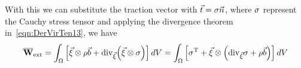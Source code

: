 \documentclass[../../main-notes.tex]{subfiles}
\begin{document}
With this we can substitute the traction vector with $\vec{t}=\bold{\sigma}\vec{n}$, where $\bold{\sigma}$ represent the Cauchy stress tensor and applying the divergence theorem in~\eqref{eqn:DerVirTen13}, we have 
\begin{equation}
    \overline{\bold{W}}_{\mathrm{ext}}
     =\int_{\Omega}
        \left[
            \vec{\xi}\otimes\rho\vec{b}+\mathrm{div}_{\vec{\xi}}\qty(\vec{\xi}\otimes\bold{\sigma})
        \right]dV
        =
    \int_{\Omega}
        \left[
            \bold{\sigma}^{\mathrm{T}}
            +
            \vec{\xi}\otimes\qty(\mathrm{div}_{\vec{\xi}}\bold{\sigma}+\rho\vec{b})
        \right]dV
\end{equation}


\begin{comment}
Stress is an important concept in characterizong the states of condensed matter.
A body is in a state of stress if it is acted upon by external force or, more generally, if one part of the body exerts forces upon another part.
If we consider a volume element within a stressed body, we can distinguish the effect of two types of forces: those acting directly in the interior of the element and those exerted upon the surface of the element by the surrounding material.
The latter forces (per unit area) are stress that are transmitted throught the interior of the volume.
For condensed matter in which the stress is homogeneous in volumes of macroscopic dimensions, the equation of state in the relation between the stress and the internal variables, such as the density and temperature.\footnote{Cite Quantum-mechanical theory of stress and force}

In order to describe general flow gradients, the velocity gradient tensor, the deformation tensor and the stress tensor are mathematical entities that help in doing so.
The velocity gradient tensor describes the steepness of velocity variation as one moves from point to point in any direction in the flow at a given instant in time.
The deformation gradient tensor describe the deformation history in a complex fluid.
Lastly, the stress tensor represent the force per unit area that is exert on a surface.\footnote{Cite Larson Book Introduction to Complex Fluids}


\end{comment}
\end{document}
